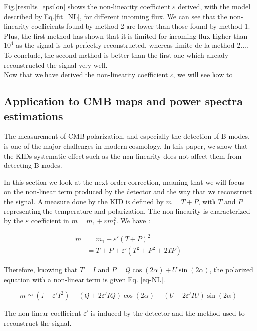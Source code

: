 Fig.\ref{results_epsilon} shows the non-linearity coefficient $\varepsilon$ derived, with the model described by Eq.\ref{fit_NL}, for different incoming flux. We can see that the non-linearity coefficients found by method 2 are lower than those found by method 1. Plus, the first method has shown that it is limited for incoming flux higher than $10^{4}$ as the signal is not perfectly reconstructed, whereas limite de la method 2.... To conclude, the second method is better than the first one which already reconstructed the signal very well.\\

Now that we have derived the non-linearity coefficient $\varepsilon$, we will see how to 


\subsection{Application to CMB maps and power spectra estimations}
The measurement of CMB polarization, and especially the detection of B modes, is one of the major challenges in modern cosmology. In this paper, we show that the KIDs systematic effect such as the non-linearity does not affect them from detecting B modes.

In this section we look at the next order correction, meaning that we will focus on the non-linear term produced by the detector and the way that we reconstruct the signal. A measure done by the KID is defined by $m = T + P$, with $T$ and $P$ representing the temperature and polarization. The non-linearity is characterized  by the $\varepsilon$ coefficient in $ m = m_{1} + \varepsilon m_{1}^{2}$. We have : 

\begin{equation}
\begin{split}
m & = m_{1} +\varepsilon' (T+P)^{2} \\
 & = T + P + \varepsilon'(T^{2} + P^{2} + 2TP) 
\end{split}
\end{equation}

Therefore, knowing that $T=I$ and $P = Q\cos(2\alpha) + U \sin(2\alpha)$, the polarized equation with a non-linear term is given Eq. \ref{eq-NL}.

\begin{equation}
m  \simeq (I + \varepsilon' I^{2}) + (Q + 2\varepsilon' IQ) \cos(2\alpha) + (U + 2 \varepsilon' IU) \sin(2\alpha)
\label{eq-NL}
\end{equation}

The non-linear coefficient $\varepsilon'$ is induced by the detector and the method used to reconstruct the signal.


